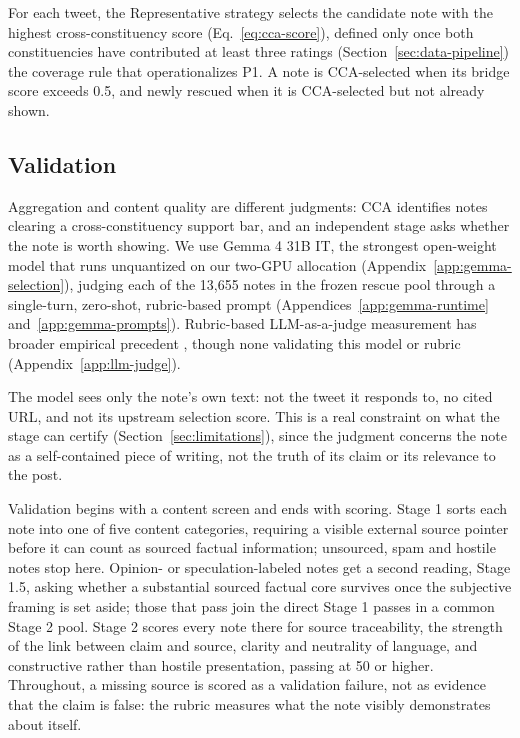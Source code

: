 \documentclass[10pt,twocolumn]{article}
\begin{document}
For each tweet, the Representative strategy selects the candidate note with the
highest cross-constituency score (Eq.~\eqref{eq:cca-score}), defined only once
both constituencies have contributed at least three ratings
(Section~\ref{sec:data-pipeline}) \textemdash{} the coverage rule that
operationalizes P1. A note is CCA-selected when its bridge score exceeds 0.5,
and newly rescued when it is CCA-selected but not already shown.

\subsection{Validation}

Aggregation and content quality are different judgments: CCA identifies notes
clearing a cross-constituency support bar, and an independent stage asks whether
the note is worth showing. We use
Gemma 4 31B IT, the strongest open-weight model that runs unquantized on our
two-GPU allocation (Appendix~\ref{app:gemma-selection}), judging each of the
13,655 notes in the frozen rescue pool through a single-turn, zero-shot,
rubric-based prompt (Appendices~\ref{app:gemma-runtime}
and~\ref{app:gemma-prompts}). Rubric-based LLM-as-a-judge measurement has
broader empirical precedent \citep{asirvatham2026gptmeasurement}, though none
validating this model or rubric (Appendix~\ref{app:llm-judge}).

The model sees only the note's own text: not the tweet it responds to, no cited
URL, and not its upstream selection score. This is a real constraint on what the
stage can certify (Section~\ref{sec:limitations}), since the judgment concerns
the note as a self-contained piece of writing, not the truth of its claim or its
relevance to the post.

Validation begins with a content screen and ends with scoring. Stage 1 sorts
each note into one of five content categories, requiring a visible external
source pointer before it can count as sourced factual information; unsourced,
spam and hostile notes stop here. Opinion- or speculation-labeled notes get a
second reading, Stage 1.5, asking whether a substantial sourced factual core
survives once the subjective framing is set aside; those that pass join the
direct Stage 1 passes in a common Stage 2 pool. Stage 2 scores every note there
for source traceability, the strength of the link between claim and source,
clarity and neutrality of language, and constructive rather than hostile
presentation, passing at 50 or higher. Throughout, a missing source is scored as
a validation failure, not as evidence that the claim is false: the rubric
measures what the note visibly demonstrates about itself.
\end{document}
